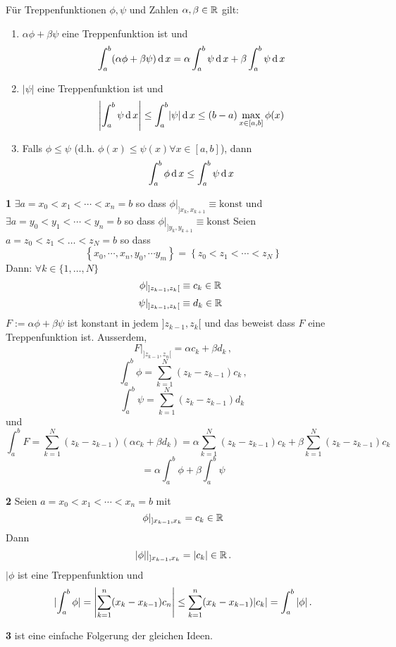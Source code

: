 \begin{Lem}
  Für Treppenfunktionen $\phi, \psi$ und Zahlen $\alpha, \beta\in\mathbb{R}$ gilt:
  \begin{enumerate}
    \item $\alpha \phi +\beta\psi$ eine Treppenfunktion ist und
      \[\int^b_a(\alpha\phi + \beta\psi)\operatorname{d} x=\alpha\int_a^b\psi\operatorname{d} x+\beta\int^b_a\psi\operatorname{d} x\]
    \item $|\psi|$ eine Treppenfunktion ist und
      \[\left|\int_a^b\psi\operatorname{d} x\right|\leq \int_a^b\mathopen| \psi \mathclose|\operatorname{d} x\leq (b-a)\max_{x\in [a,b]} \phi (x) \]
    \item Falls $\phi\leq\psi$ (d.h. $\phi(x)\leq \psi(x)\forall x\in [a,b]$), dann
      \[\int_a^b\phi\operatorname{d} x\leq\int_a^b\psi\operatorname{d} x\]
  \end{enumerate}
\end{Lem}
\begin{Bew} {\bf 1}
$\exists a = x_0<x_1<\cdots<x_n=b$ so dass $\phi|_{]x_k, x_{k+1}}\equiv \mbox{konst}$ 
und $\exists a = y_0<y_1<\cdots<y_n=b$ so dass $\phi|_{]y_k, y_{k+1}}\equiv \mbox{konst}$
Seien $a= z_0< z_1 < \ldots < z_N= b$ so dass
\[\left\{ x_0,\cdots,x_n,y_0,\cdots y_m \right\}=\left\{ z_0<z_1<\cdots<z_N \right\}\]
Dann: $\forall k\in \{1, \ldots, N\}$
\[\phi|_{]z_{k-1},z_k[}\equiv c_k\in\mathbb{R}\hspace{2mm}\]
\[\psi|_{]z_{k-1},z_k[}\equiv d_k\in\mathbb{R}\hspace{2mm}\]
$F := \alpha\phi+\beta\psi$ ist konstant in jedem $]z_{k-1}, z_k[$ und
das beweist dass $F$ eine Treppenfunktion ist. Ausserdem,
\[F|_{]z_{k-1},z_n[}=\alpha c_k + \beta d_k\, ,\]
\[\int_a^b\phi=\sum_{k=1}^N(z_k-z_{k-1})c_k\, ,\]
\[\int_a^b\psi=\sum_{k=1}^N(z_k-z_{k-1})d_k\, \]
und
\[\int_a^bF=\sum^N_{k=1}(z_k-z_{k-1})(\alpha c_k+\beta d_k)
=\alpha\sum_{k=1}^N(z_k-z_{k-1})c_k+\beta\sum_{k=1}^N(z_k-z_{k-1})c_k\]
\[=\alpha\int_a^b\phi+\beta\int_a^b\psi\]

\medskip

{\bf 2} Seien $a=x_0<x_1<\cdots<x_n=b$ mit
\[\phi|_{]x_{k-1},x_k}=c_k\in\mathbb{R}\]
Dann
\[\mathopen| \phi \mathclose||_{]x_{k-1},x_k}=\mathopen| c_k \mathclose|\in\mathbb{R}\, .\]
$|\phi$ ist eine Treppenfunktion und
\[
\mathopen| \int_a^b\phi \mathclose|=\left|\sum^n_{k=1}(x_k-x_{k-1})c_n\right|
\leq \sum^n_{k=1}(x_k-x_{k-1})\mathopen| c_k \mathclose|= \int_a^b |\phi|\, .
\]

\medskip
{\bf 3} ist eine einfache Folgerung der gleichen Ideen.
\end{Bew}
